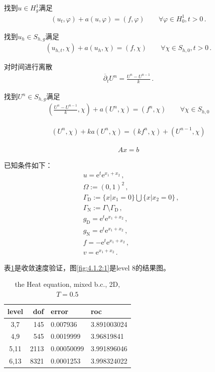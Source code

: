 找到$u\in H^1_g$满足
\begin{align}		   
  (u_t,\varphi) + a(u,\varphi)=(f,\varphi) \qquad \forall \varphi\in H^1_0, t>0\,.
\end{align}

找到$u_h\in S_{h,g}$满足
\begin{align}		   
  (u_{h,t},\chi) + a(u_h,\chi)=(f,\chi) \qquad \forall \chi\in S_{h,0}, t>0\,.
\end{align}

对时间进行离散
\begin{align}
   \overline\partial_t U^n = \frac{U^n - U^{n-1}}{k}\,.
\end{align}

找到$U^n\in S_{h,g}$满足
\begin{align}
  \left(\frac{U^n - U^{n-1}}{k},\chi\right) + a(U^n,\chi)=(f^n,\chi) \qquad \forall \chi\in S_{h,0}
\end{align}

\begin{align}
  \left(U^n,\chi\right) + ka(U^n,\chi)=(kf^n,\chi) + \left(U^{n-1},\chi\right)
\end{align}

\begin{align}
  Ax = b
\end{align}

\newpage
已知条件如下：
\begin{subequations}	   
  \begin{align*}	      
   &u=\mathrm e^t \mathrm e^{x_1+x_2}\,,\\
   &\Omega:=(0,1)^2\,,\\
   &\Gamma_{\mathrm D}:=\{x|x_1=0\}\bigcup\{x|x_2=0\}\,,\\
   &\Gamma_{\mathrm N}:=\Gamma\setminus\Gamma_{\mathrm D}\,, \\
   &g_{\mathrm D}=\mathrm e^t \mathrm e^{x_1+x_2}\,,\\
   &g_{\mathrm N}=\mathrm e^t \mathrm e^{x_1+x_2}\,,\\
   &f=-\mathrm e^t \mathrm e^{x_1+x_2}\,,\\
    &v=\mathrm e^{x_1+x_2}\,.
  \end{align*}
\end{subequations}	   

表\ref{tab:4.1.2:1}是收敛速度验证，图\ref{fig:4.1.2:1}是level 8的结果图。

\begin{table}[!htbp]\label{tab:4.1.2:1}
  \centering
  \begin{tabular}{c|r|l|l}
    level     &     dof      &      error  &         roc \\
    \hline
    3,7     &        145     &      0.007936  &      3.891003024 \\
    \hline
    4,9   &         545       &    0.0019999 &      3.96819841 \\
    \hline
    5,11  &         2113   &       0.00050099  &    3.991896046 \\
    \hline
    6,13  &         8321  &        0.0001253   &    3.998324022 
  \end{tabular}
  \caption{the Heat equation, mixed b.c., 2D, $T=0.5$}
\end{table}

